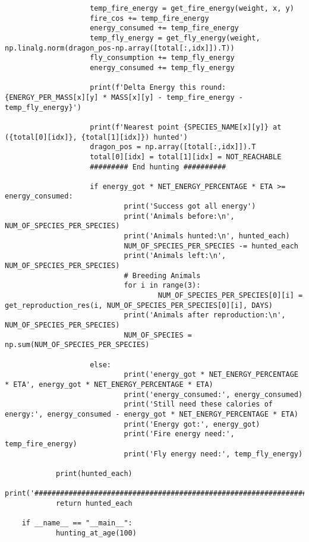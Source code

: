 \documentclass{article}
\begin{document}
\begin{lstlisting}
					temp_fire_energy = get_fire_energy(weight, x, y)
					fire_cos += temp_fire_energy
					energy_consumed += temp_fire_energy
					temp_fly_energy = get_fly_energy(weight, np.linalg.norm(dragon_pos-np.array([total[:,idx]]).T))
					fly_consumption += temp_fly_energy
					energy_consumed += temp_fly_energy
	
					print(f'Delta Energy this round: {ENERGY_PER_MASS[x][y] * MASS[x][y] - temp_fire_energy - temp_fly_energy}')
	
					print(f'Nearest point {SPECIES_NAME[x][y]} at ({total[0][idx]}, {total[1][idx]}) hunted')
					dragon_pos = np.array([total[:,idx]]).T
					total[0][idx] = total[1][idx] = NOT_REACHABLE
					######### End hunting ##########
					
					if energy_got * NET_ENERGY_PERCENTAGE * ETA >= energy_consumed:
							print('Success got all energy')
							print('Animals before:\n', NUM_OF_SPECIES_PER_SPECIES)
							print('Animals hunted:\n', hunted_each)
							NUM_OF_SPECIES_PER_SPECIES -= hunted_each
							print('Animals left:\n', NUM_OF_SPECIES_PER_SPECIES)
							# Breeding Animals
							for i in range(3):
									NUM_OF_SPECIES_PER_SPECIES[0][i] = get_reproduction_res(i, NUM_OF_SPECIES_PER_SPECIES[0][i], DAYS)
							print('Animals after reproduction:\n', NUM_OF_SPECIES_PER_SPECIES)
							NUM_OF_SPECIES = np.sum(NUM_OF_SPECIES_PER_SPECIES)
	
					else:
							print('energy_got * NET_ENERGY_PERCENTAGE * ETA', energy_got * NET_ENERGY_PERCENTAGE * ETA)
							print('energy_consumed:', energy_consumed)
							print('Still need these calories of energy:', energy_consumed - energy_got * NET_ENERGY_PERCENTAGE * ETA)
							print('Energy got:', energy_got)
							print('Fire energy need:', temp_fire_energy)
							print('Fly energy need:', temp_fly_energy)
	
			print(hunted_each)
			print('################################################################')
			return hunted_each
	
	if __name__ == "__main__":
			hunting_at_age(100)
\end{lstlisting}
\end{document}
